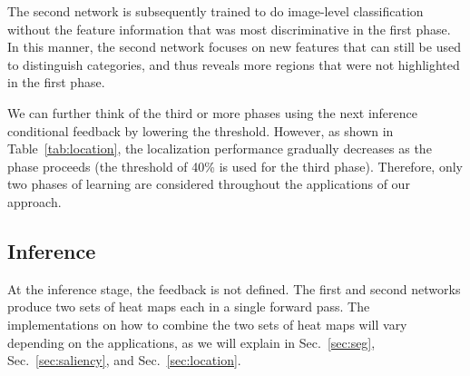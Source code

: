 \documentclass[10pt,twocolumn,letterpaper]{article}
\newcommand{\tabfref}[1]{Table~\ref{#1}}
\newcommand{\secref}[1]{Sec.~\ref{#1}}
\begin{document}
The second network is subsequently trained to do image-level classification without the feature information that was most discriminative in the first phase. In this manner, the second network focuses on new features that can still be used to distinguish categories, and thus reveals more regions that were not highlighted in the first phase.


We can further think of the third or more phases using the next inference conditional feedback by lowering the threshold. However, as shown in \tabfref{tab:location}, the localization performance gradually decreases as the phase proceeds (the threshold of 40\% is used for the third phase). Therefore, only two phases of learning are considered throughout the applications of our approach.

\subsection{Inference} 
At the inference stage, the feedback is not defined. The first and second networks produce two sets of heat maps each in a single forward pass. The implementations on how to combine the two sets of heat maps will vary depending on the applications, as we will explain in \secref{sec:seg}, \secref{sec:saliency}, and \secref{sec:location}.
\end{document}
